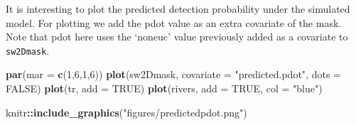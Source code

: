 \documentclass[
]{book}
\newenvironment{Shaded}{\begin{snugshade}}{\end{snugshade}}
\newcommand{\AttributeTok}[1]{\textcolor[rgb]{0.13,0.29,0.53}{#1}}
\newcommand{\ConstantTok}[1]{\textcolor[rgb]{0.56,0.35,0.01}{#1}}
\newcommand{\DecValTok}[1]{\textcolor[rgb]{0.00,0.00,0.81}{#1}}
\newcommand{\FunctionTok}[1]{\textcolor[rgb]{0.13,0.29,0.53}{\textbf{#1}}}
\newcommand{\NormalTok}[1]{#1}
\newcommand{\OtherTok}[1]{\textcolor[rgb]{0.56,0.35,0.01}{#1}}
\newcommand{\SpecialCharTok}[1]{\textcolor[rgb]{0.81,0.36,0.00}{\textbf{#1}}}
\newcommand{\StringTok}[1]{\textcolor[rgb]{0.31,0.60,0.02}{#1}}
\begin{document}
It is interesting to plot the predicted detection probability under the simulated model. For plotting we add the pdot value as an extra covariate of the mask. Note that pdot here uses the `noneuc' value previously added as a covariate to \texttt{sw2Dmask}.

\begin{Shaded}
\end{Shaded}

\begin{Shaded}
\begin{Highlighting}[]
\FunctionTok{par}\NormalTok{(}\AttributeTok{mar =} \FunctionTok{c}\NormalTok{(}\DecValTok{1}\NormalTok{,}\DecValTok{6}\NormalTok{,}\DecValTok{1}\NormalTok{,}\DecValTok{6}\NormalTok{))}
\FunctionTok{plot}\NormalTok{(sw2Dmask, }\AttributeTok{covariate =} \StringTok{"predicted.pdot"}\NormalTok{, }\AttributeTok{dots =} \ConstantTok{FALSE}\NormalTok{)}
\FunctionTok{plot}\NormalTok{(tr, }\AttributeTok{add =} \ConstantTok{TRUE}\NormalTok{)}
\FunctionTok{plot}\NormalTok{(rivers, }\AttributeTok{add =} \ConstantTok{TRUE}\NormalTok{, }\AttributeTok{col =} \StringTok{"blue"}\NormalTok{)}
\end{Highlighting}
\end{Shaded}

\begin{Shaded}
\begin{Highlighting}[]
\NormalTok{knitr}\SpecialCharTok{::}\FunctionTok{include\_graphics}\NormalTok{(}\StringTok{"figures/predictedpdot.png"}\NormalTok{)}
\end{Highlighting}
\end{Shaded}
\end{document}
